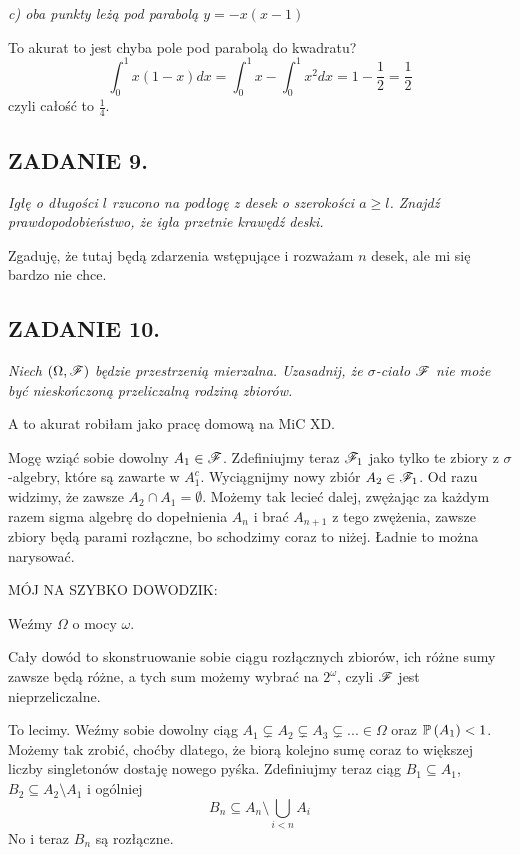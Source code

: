 \documentclass{article}
\begin{document}
\indent \emph{\color{blue}c) oba punkty leżą pod parabolą $y=-x(x-1)$}
\smallskip

To akurat to jest chyba pole pod parabolą do kwadratu?
$$\int_0^1x(1-x)dx=\int_0^1x-\int_0^1x^2dx=1-\frac12=\frac12$$
czyli całość to $\frac14$.

\subsection*{ZADANIE 9.}
\emph{Igłę o długości $l$ rzucono na podłogę z desek o szerokości $a\geq l$. Znajdź prawdopodobieństwo, że igła przetnie krawędź deski.}
\smallskip

Zgaduję, że tutaj będą zdarzenia wstępujące i rozważam $n$ desek, ale mi się bardzo nie chce.

\subsection*{ZADANIE 10.}
\emph{Niech $(\Omega,\mathcal{F})$ będzie przestrzenią mierzalna. Uzasadnij, że $\sigma$-ciało $\mathcal{F}$ nie może być nieskończoną przeliczalną rodziną zbiorów.}
\smallskip

A to akurat robiłam jako pracę domową na MiC XD.
\smallskip

Mogę wziąć sobie dowolny $A_1\in \mathcal{F}$. Zdefiniujmy teraz $\mathcal{F}_1$ jako tylko te zbiory z $\sigma$-algebry, które są zawarte w $A_1^c$. Wyciągnijmy nowy zbiór $A_2\in\mathcal{F}_1$. Od razu widzimy, że zawsze $A_2\cap A_1=\emptyset$. Możemy tak lecieć dalej, zwężając za każdym razem sigma algebrę do dopełnienia $A_n$ i brać $A_{n+1}$ z tego zwężenia, zawsze zbiory będą parami rozłączne, bo schodzimy coraz to niżej. Ładnie to można narysować.
\smallskip

MÓJ NA SZYBKO DOWODZIK:

Weźmy $\Omega$ o mocy $\omega$.

Cały dowód to skonstruowanie sobie ciągu rozłącznych zbiorów, ich różne sumy zawsze będą różne, a tych sum możemy wybrać na $2^\omega$, czyli $\mathcal{F}$ jest nieprzeliczalne.

To lecimy. Weźmy sobie dowolny ciąg $A_1\subsetneq A_2\subsetneq A_3\subsetneq...\in\Omega$ oraz $\mathbb{P}\left(A_1\right)<1$. Możemy tak zrobić, choćby dlatego, że biorą kolejno sumę coraz to większej liczby singletonów dostaję nowego pyśka. Zdefiniujmy teraz ciąg $B_1\subseteq A_1$, $B_2\subseteq A_2\setminus A_1$ i ogólniej
$$B_n\subseteq A_n\setminus\bigcup\limits_{i< n} A_{i}$$
No i teraz $B_n$ są rozłączne.
\end{document}
